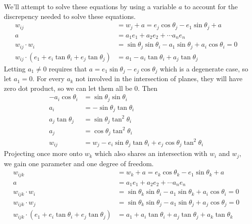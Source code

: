 We'll attempt to solve these equations by using a variable $a$ to
account for the discrepency needed to solve these equations. 
\begin{align}
  w_{ij} &= w_j + a = e_j \cos \theta_j - e_1 \sin \theta_j + a\\
  a &= a_1e_1 + a_2e_2 + \cdots a_n e_n \\
  w_{ij} \cdot w_i &= \sin \theta_j\sin\theta_i - a_1 \sin\theta_j +
                     a_i \cos \theta_i = 0\\
  w_{ij} \cdot (e_1 + e_i \tan \theta_i + e_j \tan \theta_j) &= a_1 -
                                                               a_i
                                                               \tan
                                                               \theta_i
                                                               + a_j
                                                               \tan \theta_j
\end{align}
Letting $a_1 \neq 0$ requires that $a = e_1 \sin \theta_j - e_j \cos
\theta_j$ which is a degenerate case, so let $a_1 = 0$. For every
$a_k$ not involved in the intersection of planes, they will have zero
dot product, so we can let them all be 0. Then
\begin{align}
  -a_i \cos \theta_i &= \sin \theta_j \sin \theta_i\\
  a_i &= -\sin \theta_j \tan \theta_i\\
  a_j \tan \theta_j &= \sin \theta_j \tan^2 \theta_i\\
  a_j &= \cos \theta_j \tan^2 \theta_i\\
  w_{ij} &= w_j - e_i \sin \theta_j \tan \theta_i + e_j \cos \theta_j
           \tan^2 \theta_i
\end{align}
Projecting once more onto $w_{k}$ which also shares an intersection
with $w_i$ and $w_j$, we gain one parameter and one degree of
freedom.
\begin{align}
  w_{ijk} &= w_k + a = e_k \cos \theta_k - e_1 \sin \theta_k + a\\
  a &= a_1e_1 + a_2e_2 + \cdots a_n e_n \\
  w_{ijk} \cdot w_i &= \sin \theta_k\sin\theta_i - a_1 \sin\theta_k +
                     a_i \cos \theta_i = 0\\
  w_{ijk} \cdot w_j &= \sin \theta_k\sin\theta_j - a_1 \sin\theta_j +
                     a_j \cos \theta_j = 0\\
  w_{ijk} \cdot (e_1 + e_i \tan \theta_i + e_j \tan \theta_j) &= a_1 +
                                                               a_i
                                                               \tan
                                                               \theta_i
                                                               + a_j
                                                               \tan
                                                                \theta_j
                                                                + a_k
                                                                \tan \theta_k
\end{align}
